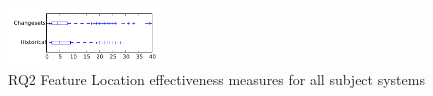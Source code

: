
\begin{figure}[t]
\centering
\includegraphics[width=0.36\textwidth]{figures/flt/rq2_tiny}
\caption{RQ2 Feature Location effectiveness measures for all subject systems}
\label{fig:flt:rq2:tiny}
\end{figure}
